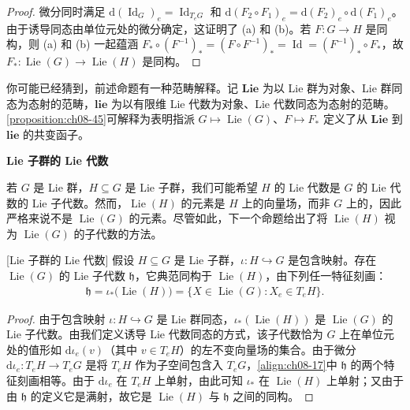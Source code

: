 \documentclass[../../main.tex]{subfiles}
\begin{document}
\begin{proof}
微分同时满足 $\mathrm{d}(\operatorname{Id}_G)_e=\operatorname{Id}_{T_eG}$ 和 $\mathrm{d}(F_2\circ F_1)_e=\mathrm{d}(F_2)_e\circ\mathrm{d}(F_1)_e$。由于诱导同态由单位元处的微分确定，这证明了 (a) 和 (b)。若 $F\colon G\to H$ 是同构，则 (a) 和 (b) 一起蕴涵 $F_*\circ(F^{-1})_*=(F\circ F^{-1})_*=\operatorname{Id}=(F^{-1})_*\circ F_*$，故 $F_*\colon\operatorname{Lie}(G)\to\operatorname{Lie}(H)$ 是同构。
\end{proof}

你可能已经猜到，前述命题有一种范畴解释。记 $\mathbf{Lie}$ 为以 Lie 群为对象、Lie 群同态为态射的范畴，$\mathbf{lie}$ 为以有限维 Lie 代数为对象、Lie 代数同态为态射的范畴。\cref{proposition:ch08-45}可解释为表明指派 $G\mapsto\operatorname{Lie}(G)$、$F\mapsto F_*$ 定义了从 $\mathbf{Lie}$ 到 $\mathbf{lie}$ 的共变函子。

\textbf{Lie 子群的 Lie 代数}

若 $G$ 是 Lie 群，$H\subseteq G$ 是 Lie 子群，我们可能希望 $H$ 的 Lie 代数是 $G$ 的 Lie 代数的 Lie 子代数。然而，$\operatorname{Lie}(H)$ 的元素是 $H$ 上的向量场，而非 $G$ 上的，因此严格来说不是 $\operatorname{Lie}(G)$ 的元素。尽管如此，下一个命题给出了将 $\operatorname{Lie}(H)$ 视为 $\operatorname{Lie}(G)$ 的子代数的方法。

\begin{theorem}\label{theorem:ch08-46}[Lie 子群的 Lie 代数]
假设 $H\subseteq G$ 是 Lie 子群，$\iota\colon H\hookrightarrow G$ 是包含映射。存在 $\operatorname{Lie}(G)$ 的 Lie 子代数 $\mathfrak{h}$，它典范同构于 $\operatorname{Lie}(H)$，由下列任一特征刻画：
\begin{align}
\mathfrak{h}=\iota_*\bigl(\operatorname{Lie}(H)\bigr)=\{X\in\operatorname{Lie}(G):X_e\in T_eH\}.\label{align:ch08-17}
\end{align}
\end{theorem}

\begin{proof}
由于包含映射 $\iota\colon H\hookrightarrow G$ 是 Lie 群同态，$\iota_*(\operatorname{Lie}(H))$ 是 $\operatorname{Lie}(G)$ 的 Lie 子代数。由我们定义诱导 Lie 代数同态的方式，该子代数恰为 $G$ 上在单位元处的值形如 $\mathrm{d}\iota_e(v)$（其中 $v\in T_eH$）的左不变向量场的集合。由于微分 $\mathrm{d}\iota_e\colon T_eH\to T_eG$ 是将 $T_eH$ 作为子空间包含入 $T_eG$，\eqref{align:ch08-17}中 $\mathfrak{h}$ 的两个特征刻画相等。由于 $\mathrm{d}\iota_e$ 在 $T_eH$ 上单射，由此可知 $\iota_*$ 在 $\operatorname{Lie}(H)$ 上单射；又由于由 $\mathfrak{h}$ 的定义它是满射，故它是 $\operatorname{Lie}(H)$ 与 $\mathfrak{h}$ 之间的同构。
\end{proof}
\end{document}
